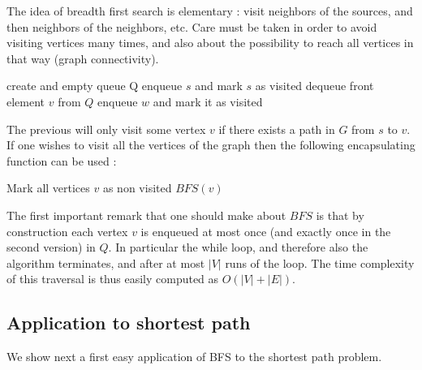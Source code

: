 \documentclass[12pt]{article}
\theoremstyle{plain}
\theoremstyle{remark}
\begin{document}
The idea of breadth first search is elementary : visit neighbors of the sources,
and then neighbors of the neighbors, etc. Care must be taken in order to avoid 
visiting vertices many times, and also about the possibility to reach all
vertices in that way (graph connectivity).

\medskip

\begin{algorithm}[H]
\caption{Breadth first search from source vertex $s$}
\begin{algorithmic}
\State create and empty queue Q
\State enqueue $s$ and mark $s$ as visited
\State dequeue front element $v$ from $Q$
	enqueue $w$ and mark it as visited
	\EndIf
	\EndFor
	\EndWhile
	\EndFunction
\end{algorithmic}
\end{algorithm}

The previous will only visit some vertex $v$ if there exists a path in $G$ from
$s$ to $v$. If one wishes to visit all the vertices of the graph then the following 
encapsulating function can be used :

\begin{algorithm}[H]
\caption{Breadth first search full traversal}
\begin{algorithmic}
	\State Mark all vertices $v$ as non visited
		$BFS(v)$
		\EndIf
	\EndFor
\EndFunction
\end{algorithmic}
\end{algorithm}

The first important remark that one should make about $BFS$ is that by construction
each vertex $v$ is enqueued at most once (and exactly once in the
second version) in $Q$. In particular the while loop, and therefore also the
algorithm terminates, and after at most $|V|$ runs of the loop. The time
complexity of this traversal is thus easily computed as $O(|V| + |E|)$.

\subsection{Application to shortest path}

We show next a first easy application of BFS to the shortest path problem.
\end{document}
